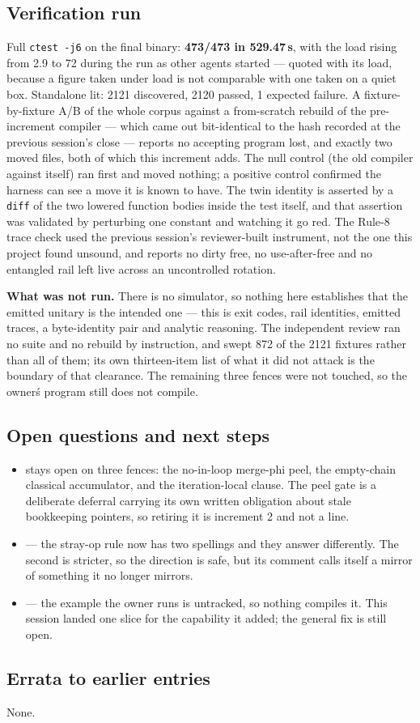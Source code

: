 \subsection*{Verification run}
Full \texttt{ctest -j6} on the final binary: \textbf{473/473 in 529.47\,s}, with the load rising
from 2.9 to 72 during the run as other agents started --- quoted with its load, because a figure
taken under load is not comparable with one taken on a quiet box. Standalone lit: 2121 discovered,
2120 passed, 1 expected failure. A fixture-by-fixture A/B of the whole corpus against a
from-scratch rebuild of the pre-increment compiler --- which came out bit-identical to the hash
recorded at the previous session's close --- reports no accepting program lost, and exactly two
moved files, both of which this increment adds. The null control (the old compiler against itself)
ran first and moved nothing; a positive control confirmed the harness can see a move it is known to
have. The twin identity is asserted by a \texttt{diff} of the two lowered function bodies inside the
test itself, and that assertion was validated by perturbing one constant and watching it go red.
The Rule-8 trace check used the previous session's reviewer-built instrument, not the one this
project found unsound, and reports no dirty free, no use-after-free and no entangled rail left live
across an uncontrolled rotation.

\textbf{What was not run.} There is no simulator, so nothing here establishes that the emitted
unitary is the intended one --- this is exit codes, rail identities, emitted traces, a byte-identity
pair and analytic reasoning. The independent review ran no suite and no rebuild by instruction, and
swept 872 of the 2121 fixtures rather than all of them; its own thirteen-item list of what it did not
attack is the boundary of that clearance. The remaining three fences were not touched, so the
owner\'s program still does not compile.

\subsection*{Open questions and next steps}
\begin{itemize}
  \item {} stays open on three fences: the no-in-loop merge-phi peel, the empty-chain classical
        accumulator, and the iteration-local clause. The peel gate is a deliberate deferral carrying
        its own written obligation about stale bookkeeping pointers, so retiring it is increment 2 and
        not a line.
  \item {} --- the stray-op rule now has two spellings and they answer differently. The second
        is stricter, so the direction is safe, but its comment calls itself a mirror of something it
        no longer mirrors.
  \item {} --- the example the owner runs is untracked, so nothing compiles it. This session
        landed one slice for the capability it added; the general fix is still open.
\end{itemize}

\subsection*{Errata to earlier entries}
None.

